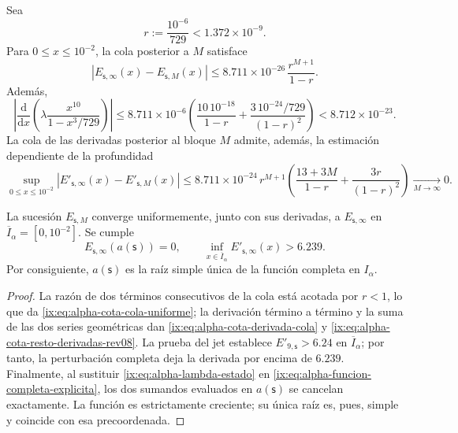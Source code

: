Sea
\[
 r:=\frac{10^{-6}}{729}<1.372\mathbin{\times}10^{-9}.
\]
Para \(0\leq x\leq10^{-2}\), la cola posterior a \(M\) satisface
\begin{equation}
 \left|E_{\mathsf s,\infty}(x)-E_{\mathsf s,M}(x)\right|
 \leq
 8.711\mathbin{\times}10^{-26}\,\frac{r^{M+1}}{1-r}.
 \label{ix:eq:alpha-cota-cola-uniforme}
\end{equation}
Además,
\begin{equation}
 \left|\frac{\mathrm d}{\mathrm dx}
  \left(\lambda\frac{x^{10}}{1-x^3/729}\right)\right|
 \leq 8.711\mathbin{\times}10^{-6}
 \left(\frac{10\,10^{-18}}{1-r}
 +\frac{3\,10^{-24}/729}{(1-r)^2}\right)
 <8.712\mathbin{\times}10^{-23}.
 \label{ix:eq:alpha-cota-derivada-cola}
\end{equation}
La cola de las derivadas posterior al bloque \(M\) admite, además, la
estimación dependiente de la profundidad
\begin{equation}
 \sup_{0\le x\le10^{-2}}
 \left|E'_{\mathsf s,\infty}(x)-E'_{\mathsf s,M}(x)\right|
 \le 8.711\mathbin{\times}10^{-24}\,r^{M+1}
 \left(\frac{13+3M}{1-r}+\frac{3r}{(1-r)^2}\right)
 \xrightarrow[M\to\infty]{}0.
 \label{ix:eq:alpha-cota-resto-derivadas-rev08}
\end{equation}

\begin{theorem}
\label{ix:thm:alpha-raiz-completa-explicita}
La sucesión \(E_{\mathsf s,M}\) converge uniformemente, junto con sus
derivadas, a \(E_{\mathsf s,\infty}\) en
\(\overline I_\alpha=[0,10^{-2}]\). Se cumple
\begin{equation}
 E_{\mathsf s,\infty}(a(\mathsf s))=0,
 \qquad
 \inf_{x\in\overline I_\alpha}
 E'_{\mathsf s,\infty}(x)>6.239.
 \label{ix:eq:alpha-raiz-y-derivada-completas}
\end{equation}
Por consiguiente, \(a(\mathsf s)\) es la raíz simple única de la función
completa en \(I_\alpha\).
\end{theorem}

\begin{proof}
La razón de dos términos consecutivos de la cola está acotada por \(r<1\),
lo que da \eqref{ix:eq:alpha-cota-cola-uniforme}; la derivación término a
término y la suma de las dos series geométricas dan
\eqref{ix:eq:alpha-cota-derivada-cola} y
\eqref{ix:eq:alpha-cota-resto-derivadas-rev08}. La prueba del jet establece
\(E'_{9,\mathsf s}>6.24\) en \(\overline I_\alpha\); por tanto, la
perturbación completa deja la derivada por encima de \(6.239\).
Finalmente, al sustituir \eqref{ix:eq:alpha-lambda-estado} en
\eqref{ix:eq:alpha-funcion-completa-explicita}, los dos sumandos evaluados en
\(a(\mathsf s)\) se cancelan exactamente. La función es estrictamente
creciente; su única raíz es, pues, simple y coincide con esa precoordenada.
\end{proof}

